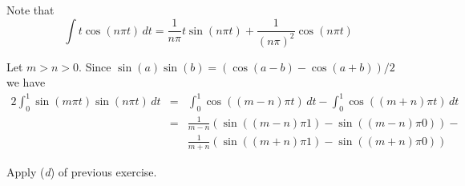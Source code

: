 \begin{enumerate}
\begin{itemize}
Note that
\begin{equation*}
\int t\cos(n\pi t)\,dt 
 = \frac{1}{n\pi} t\sin(n\pi t) + \frac{1}{(n\pi)^2} \cos(n\pi t)
\end{equation*}

\iffalse
If \(\kappa(t) = \cos(n\pi t)\) then
\begin{eqnarray*}
(T \kappa)(s) 
&=& \int_0^s t\cdot \cos(n \pi t)\,dt + s\int_s^1 \cos(n \pi t)\,dt 
   -s \int_0^1  t\cdot \cos(n \pi t)\,dt \\
&=& \left.\left(
  \frac{1}{n\pi} t\sin(n\pi t) + \frac{1}{(n\pi)^2} \cos(n\pi t)
  \right)\right\rvert_0^s \\
& & + \frac{s}{n\pi}\left.\left(
       \sin(n \pi t)
      \right)\right\rvert_s^1 \\
& & + s\left.\left(
  \frac{1}{n\pi} t\sin(n\pi t) + \frac{1}{(n\pi)^2} \cos(n\pi t)
  \right)\right\rvert_0^1 \\
&=& \frac{1}{(n\pi)^2}(\cos(n \pi s) - 1) 
    + \frac{s}{n\pi} \sin(n \pi s)
    + s\left( \frac{1}{n\pi} s\sin(n\pi)
    + \frac{1}{(n\pi)^2}(\cos(n\pi s) - 1)\right)
\end{eqnarray*}
\fi 
\unfinished

Let \(m>n>0\). Since \(\sin(a)\sin(b) = \left(\cos(a-b)
- \cos(a+b)\right)/2\)
we have
\begin{eqnarray*}
2\int_0^1 \sin(m\pi t) \sin(n\pi t)\,dt 
&=& \int_0^1 \cos((m-n)\pi t)\,dt - \int_0^1 \cos((m+n)\pi t)\,dt \\
&=& \frac{1}{m-n}\left (\sin((m-n)\pi 1) -  \sin((m-n)\pi 0)\right) - \\
& & \frac{1}{m+n}\left (\sin((m+n)\pi 1) -  \sin((m+n)\pi 0)\right)
\end{eqnarray*}

 Apply (\emph{d}) of previous exercise.


\end{itemize}
\end{enumerate}
